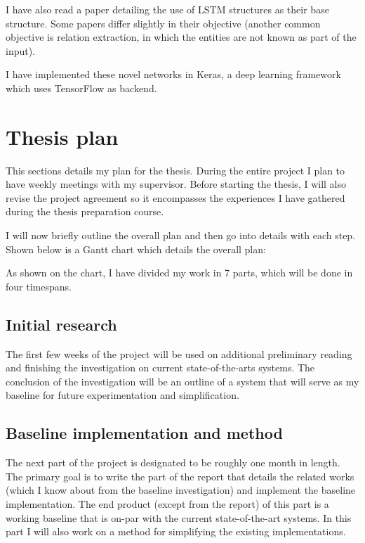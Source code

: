 \documentclass[12pt]{article}
\begin{document}
I have also read a paper detailing the use of LSTM structures as their base structure\cite{re_lstm}. Some papers differ slightly in their objective (another common objective is relation extraction, in which the entities are not known as part of the input).

I have implemented these novel networks in Keras, a deep learning framework which uses TensorFlow as backend\cite{keras}\cite{tensorflow}.  

\newpage

\section{Thesis plan}

This sections details my plan for the thesis. 
During the entire project I plan to have weekly meetings with my supervisor. Before starting the thesis, I will
also revise the project agreement so it encompasses the experiences I have gathered during the thesis preparation course. 

I will now briefly outline the overall plan and then go into details with each step.
Shown below is a Gantt chart which details the overall plan:

\begin{center}
\end{center}

As shown on the chart, I have divided my work in 7 parts, which will be done in four timespans.

\subsection{Initial research}
 The first few weeks of the project will be used on additional preliminary reading and finishing the investigation on current state-of-the-arts systems.
The conclusion of the investigation will be an outline of a system that will serve
as my baseline for future experimentation and simplification. 

\subsection{Baseline implementation and method}
The next part of the project is designated to be roughly one month in length. The primary goal is to write the part of the report that details the related works (which I know about from the baseline investigation) and implement the baseline implementation. The end product (except from the report) of this part is a working baseline that is on-par with the current state-of-the-art systems. In this part I will also work on a method for simplifying the existing implementations. 
\end{document}
